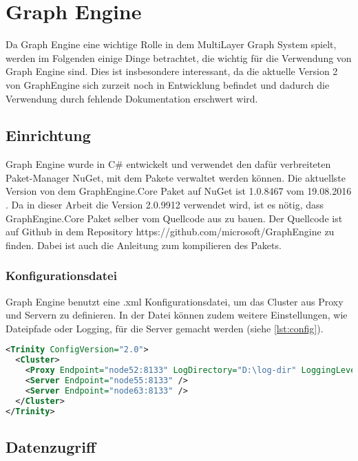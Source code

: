 \section{Graph Engine}

Da Graph Engine eine wichtige Rolle in dem MultiLayer Graph System spielt, werden im Folgenden einige Dinge betrachtet, die wichtig für die Verwendung von Graph Engine sind.
Dies ist insbesondere interessant, da die aktuelle Version 2 von GraphEngine sich zurzeit noch in Entwicklung befindet und dadurch die Verwendung durch fehlende Dokumentation erschwert wird.


\subsection{Einrichtung}

Graph Engine wurde in C\# entwickelt und verwendet den dafür verbreiteten Paket-Manager NuGet, mit dem Pakete verwaltet werden können.
Die aktuellste Version von dem GraphEngine.Core Paket auf NuGet ist 1.0.8467 vom 	19.08.2016 \cite{geVersion}. Da in dieser Arbeit die Version 2.0.9912 verwendet wird, ist es nötig, dass GraphEngine.Core Paket selber vom Quellcode aus zu bauen.
Der Quellcode ist auf Github in dem Repository https://github.com/microsoft/GraphEngine zu finden. Dabei ist auch die Anleitung zum kompilieren des Pakets.


\subsubsection{Konfigurationsdatei}

Graph Engine benutzt eine .xml Konfigurationsdatei, um das Cluster aus Proxy und Servern zu definieren.
In der Datei können zudem weitere Einstellungen, wie Dateipfade oder Logging, für die Server gemacht werden (siehe \ref{lst:config}).

\begin{lstlisting}[language=xml, label={lst:config}, caption={Beispiel Konfigurationsdatei für ein Cluster mit einer Proxy und zwei Servern}]
  <Trinity ConfigVersion="2.0">
  <Cluster>
    <Proxy Endpoint="node52:8133" LogDirectory="D:\log-dir" LoggingLevel="Info" />  
    <Server Endpoint="node55:8133" />
    <Server Endpoint="node63:8133" />
  </Cluster>
</Trinity>

\end{lstlisting}


\subsection{Datenzugriff}


